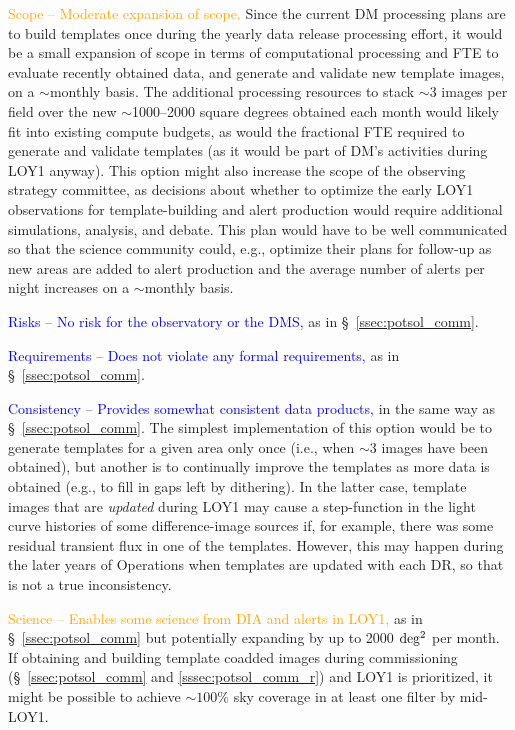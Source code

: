 \documentclass[DM,lsstdraft,toc]{lsstdoc}
\begin{document}
\textcolor{orange}{ Scope -- Moderate expansion of scope.} Since the current DM processing plans are to build templates once during the yearly data release processing effort, it would be a small expansion of scope in terms of computational processing and FTE to evaluate recently obtained data, and generate and validate new template images, on a $\sim$monthly basis. The additional processing resources to stack $\sim$3 images per field over the new $\sim$1000--2000 square degrees obtained each month would likely fit into existing compute budgets, as would the fractional FTE required to generate and validate templates (as it would be part of DM's activities during LOY1 anyway). This option might also increase the scope of the observing strategy committee, as decisions about whether to optimize the early LOY1 observations for template-building and alert production would require additional simulations, analysis, and debate. This plan would have to be well communicated so that the science community could, e.g., optimize their plans for follow-up as new areas are added to alert production and the average number of alerts per night increases on a $\sim$monthly basis.

\textcolor{blue}{ Risks -- No risk for the observatory or the DMS,} as in \S~\ref{ssec:potsol_comm}. 

\textcolor{blue}{ Requirements -- Does not violate any formal requirements,} as in \S~\ref{ssec:potsol_comm}. 

\textcolor{blue}{ Consistency -- Provides somewhat consistent data products,} in the same way as \S~\ref{ssec:potsol_comm}. The simplest implementation of this option would be to generate templates for a given area only once (i.e., when $\sim$3 images have been obtained), but another is to continually improve the templates as more data is obtained (e.g., to fill in gaps left by dithering). In the latter case, template images that are {\em updated} during LOY1 may cause a step-function in the light curve histories of some difference-image sources if, for example, there was some residual transient flux in one of the templates. However, this may happen during the later years of Operations when templates are updated with each DR, so that is not a true inconsistency.

\textcolor{orange}{ Science -- Enables some science from DIA and alerts in LOY1,} as in \S~\ref{ssec:potsol_comm} but potentially expanding by up to 2000 $\rm deg^2$ per month. If obtaining and building template coadded images during commissioning (\S~\ref{ssec:potsol_comm} and \ref{sssec:potsol_comm_r}) and LOY1 is prioritized, it might be possible to achieve $\sim100\%$ sky coverage in at least one filter by mid-LOY1.
\end{document}

